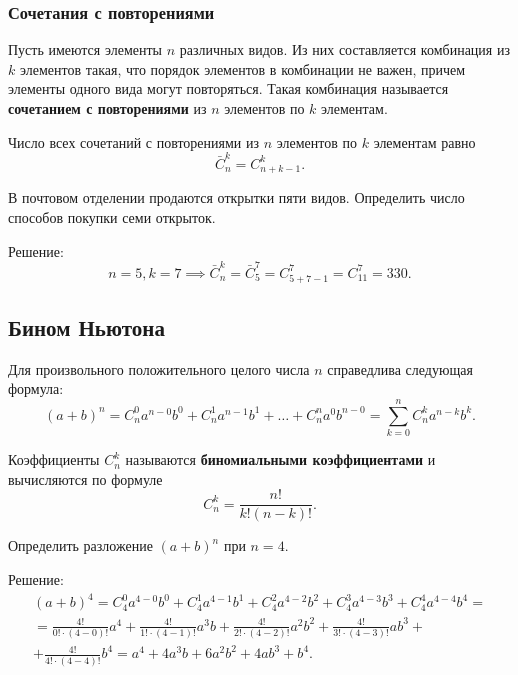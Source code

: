 \subsubsection{Сочетания с повторениями}

Пусть имеются элементы \(n\) различных видов. Из них составляется комбинация из \(k\) элементов такая, что порядок элементов в комбинации не важен, причем элементы одного вида могут повторяться. Такая комбинация называется \textbf{сочетанием с повторениями} из \(n\) элементов по \(k\) элементам.

\begin{theorem*}
    Число всех сочетаний с повторениями из \(n\) элементов по \(k\) элементам равно
    \[
        \bar{C}_n^k = C_{n + k - 1}^k.
    \]
\end{theorem*}

\begin{example*}
    В почтовом отделении продаются открытки пяти видов. Определить число способов покупки семи открыток.

    Решение:
    \[
        n = 5, k = 7
        \implies
        \bar{C}_n^k = \bar{C}_5^7 = C_{5 + 7 - 1}^7 = C_{11}^7 = 330.
    \]
\end{example*}

\subsection{Бином Ньютона}

Для произвольного положительного целого числа \(n\) справедлива следующая формула:
\[
    (a + b)^n =
    C_n^0 a^{n - 0} b^0 + C_n^1 a^{n - 1} b^1 + \ldots + C_n^n a^0 b^{n - 0} =
    \sum_{k = 0}^n C_n^k a^{n - k} b^k.
\]

Коэффициенты \(C_n^k\) называются \textbf{биномиальными коэффициентами} и вычисляются по формуле
\[
    C_n^k = \frac{n!}{k! (n - k)!}.
\]

\begin{example*}
    Определить разложение \((a + b)^n\) при \(n = 4\).

    Решение:
    \begin{gather*}
        (a + b)^4 =
        C_4^0 a^{4 - 0} b^0 + C_4^1 a^{4 - 1}b^1 + C_4^2 a^{4 - 2} b^2 + C_4^3 a^{4 - 3} b^3 + C_4^4 a^{4 - 4} b^4 = \\ =
        \frac{4!}{0! \cdot (4 - 0)!} a^4 + \frac{4!}{1! \cdot (4 - 1)!} a^3 b + \frac{4!}{2! \cdot (4 - 2)!} a^2 b^2 + \frac{4!}{3! \cdot (4 - 3)!} a b^3 + \\ + \frac{4!}{4! \cdot (4 - 4)!} b^4 =
        a^4 + 4 a^3 b + 6  a^2 b^2 + 4 a b^3 + b^4.
    \end{gather*}
\end{example*}

